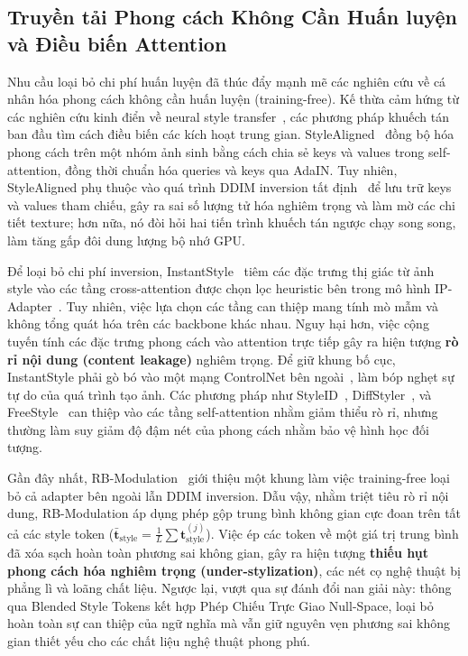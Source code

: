 \documentclass[runningheads]{llncs}
\begin{document}
\subsection{Truyền tải Phong cách Không Cần Huấn luyện và Điều biến Attention}
Nhu cầu loại bỏ chi phí huấn luyện đã thúc đẩy mạnh mẽ các nghiên cứu về cá nhân hóa phong cách không cần huấn luyện (training-free). Kế thừa cảm hứng từ các nghiên cứu kinh điển về neural style transfer~\cite{Gatys_2016_CVPR,AdaIn}, các phương pháp khuếch tán ban đầu tìm cách điều biến các kích hoạt trung gian. StyleAligned~\cite{stylealigned} đồng bộ hóa phong cách trên một nhóm ảnh sinh bằng cách chia sẻ keys và values trong self-attention, đồng thời chuẩn hóa queries và keys qua AdaIN. Tuy nhiên, StyleAligned phụ thuộc vào quá trình DDIM inversion tất định~\cite{DDIM} để lưu trữ keys và values tham chiếu, gây ra sai số lượng tử hóa nghiêm trọng và làm mờ các chi tiết texture; hơn nữa, nó đòi hỏi hai tiến trình khuếch tán ngược chạy song song, làm tăng gấp đôi dung lượng bộ nhớ GPU.

Để loại bỏ chi phí inversion, InstantStyle~\cite{instantstyle} tiêm các đặc trưng thị giác từ ảnh style vào các tầng cross-attention được chọn lọc heuristic bên trong mô hình IP-Adapter~\cite{ipadapter}. Tuy nhiên, việc lựa chọn các tầng can thiệp mang tính mò mẫm và không tổng quát hóa trên các backbone khác nhau. Nguy hại hơn, việc cộng tuyến tính các đặc trưng phong cách vào attention trực tiếp gây ra hiện tượng \textbf{rò rỉ nội dung (content leakage)} nghiêm trọng. Để giữ khung bố cục, InstantStyle phải gò bó vào một mạng ControlNet bên ngoài~\cite{controlNet}, làm bóp nghẹt sự tự do của quá trình tạo ảnh. Các phương pháp như StyleID~\cite{styleid}, DiffStyler~\cite{diffstyler}, và FreeStyle~\cite{freestyle} can thiệp vào các tầng self-attention nhằm giảm thiểu rò rỉ, nhưng thường làm suy giảm độ đậm nét của phong cách nhằm bảo vệ hình học đối tượng.

Gần đây nhất, RB-Modulation~\cite{rout2025rbmodulation} giới thiệu một khung làm việc training-free loại bỏ cả adapter bên ngoài lẫn DDIM inversion. Dẫu vậy, nhằm triệt tiêu rò rỉ nội dung, RB-Modulation áp dụng phép gộp trung bình không gian cực đoan trên tất cả các style token ($\bar{\mathbf{t}}_{\text{style}} = \frac{1}{L} \sum \mathbf{t}_{\text{style}}^{(j)}$). Việc ép các token về một giá trị trung bình đã xóa sạch hoàn toàn phương sai không gian, gây ra hiện tượng \textbf{thiếu hụt phong cách hóa nghiêm trọng (under-stylization)}, các nét cọ nghệ thuật bị phẳng lì và loãng chất liệu. Ngược lại, \method vượt qua sự đánh đổi nan giải này: thông qua Blended Style Tokens kết hợp Phép Chiếu Trực Giao Null-Space, \method loại bỏ hoàn toàn sự can thiệp của ngữ nghĩa mà vẫn giữ nguyên vẹn phương sai không gian thiết yếu cho các chất liệu nghệ thuật phong phú.
\end{document}
